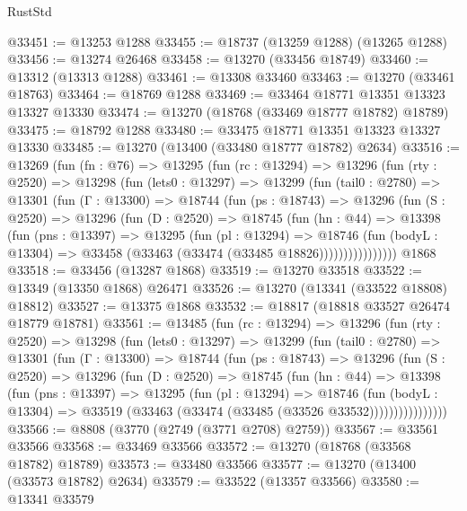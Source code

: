 \begin{lexlean}{RustStd}
\begin{coremodule}
@33451 := @13253 @1288
@33455 := @18737 (@13259 @1288) (@13265 @1288)
@33456 := @13274 @26468
@33458 := @13270 (@33456 @18749)
@33460 := @13312 (@13313 @1288)
@33461 := @13308 @33460
@33463 := @13270 (@33461 @18763)
@33464 := @18769 @1288
@33469 := @33464 @18771 @13351 @13323 @13327 @13330
@33474 := @13270 (@18768 (@33469 @18777 @18782) @18789)
@33475 := @18792 @1288
@33480 := @33475 @18771 @13351 @13323 @13327 @13330
@33485 := @13270 (@13400 (@33480 @18777 @18782) @2634)
@33516 := @13269
    (fun (fn : @76) =>
    @13295
      (fun (rc : @13294) =>
      @13296
        (fun (rty : @2520) =>
        @13298
          (fun (lets0 : @13297) =>
          @13299
            (fun (tail0 : @2780) =>
            @13301
              (fun (Γ : @13300) =>
              @18744
                (fun (ps : @18743) =>
                @13296
                  (fun (S : @2520) =>
                  @13296
                    (fun (D : @2520) =>
                    @18745
                      (fun (hn : @44) =>
                      @13398
                        (fun (pns : @13397) =>
                        @13295
                          (fun (pl : @13294) =>
                          @18746
                            (fun (bodyL : @13304) =>
                            @33458 (@33463 (@33474 (@33485 @18826))))))))))))))))
    @1868
@33518 := @33456 (@13287 @1868)
@33519 := @13270 @33518
@33522 := @13349 (@13350 @1868) @26471
@33526 := @13270 (@13341 (@33522 @18808) @18812)
@33527 := @13375 @1868
@33532 := @18817 (@18818 @33527 @26474 @18779 @18781)
@33561 := @13485
    (fun (rc : @13294) =>
    @13296
      (fun (rty : @2520) =>
      @13298
        (fun (lets0 : @13297) =>
        @13299
          (fun (tail0 : @2780) =>
          @13301
            (fun (Γ : @13300) =>
            @18744
              (fun (ps : @18743) =>
              @13296
                (fun (S : @2520) =>
                @13296
                  (fun (D : @2520) =>
                  @18745
                    (fun (hn : @44) =>
                    @13398
                      (fun (pns : @13397) =>
                      @13295
                        (fun (pl : @13294) =>
                        @18746
                          (fun (bodyL : @13304) =>
                          @33519 (@33463 (@33474 (@33485 (@33526 @33532))))))))))))))))
@33566 := @8808 (@3770 (@2749 (@3771 @2708) @2759))
@33567 := @33561 @33566
@33568 := @33469 @33566
@33572 := @13270 (@18768 (@33568 @18782) @18789)
@33573 := @33480 @33566
@33577 := @13270 (@13400 (@33573 @18782) @2634)
@33579 := @33522 (@13357 @33566)
@33580 := @13341 @33579

\end{coremodule}
\end{lexlean}
